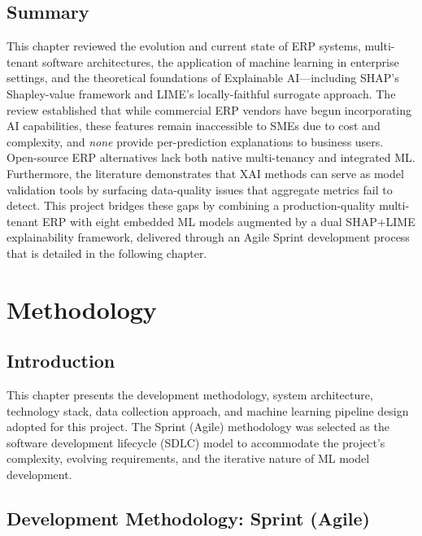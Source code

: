 \documentclass[12pt,a4paper]{report}
\begin{document}
\section{Summary}
\label{sec:lit_summary}

This chapter reviewed the evolution and current state of ERP systems, multi-tenant software architectures, the application of machine learning in enterprise settings, and the theoretical foundations of Explainable AI---including SHAP's Shapley-value framework and LIME's locally-faithful surrogate approach. The review established that while commercial ERP vendors have begun incorporating AI capabilities, these features remain inaccessible to SMEs due to cost and complexity, and \textit{none} provide per-prediction explanations to business users. Open-source ERP alternatives lack both native multi-tenancy and integrated ML. Furthermore, the literature demonstrates that XAI methods can serve as model validation tools by surfacing data-quality issues that aggregate metrics fail to detect. This project bridges these gaps by combining a production-quality multi-tenant ERP with eight embedded ML models augmented by a dual SHAP+LIME explainability framework, delivered through an Agile Sprint development process that is detailed in the following chapter.


%
%
\chapter{Methodology}
\label{ch:methodology}

\section{Introduction}
\label{sec:meth_intro}

This chapter presents the development methodology, system architecture, technology stack, data collection approach, and machine learning pipeline design adopted for this project. The Sprint (Agile) methodology was selected as the software development lifecycle (SDLC) model to accommodate the project's complexity, evolving requirements, and the iterative nature of ML model development.

\section{Development Methodology: Sprint (Agile)}
\label{sec:sprint_methodology}
\end{document}
